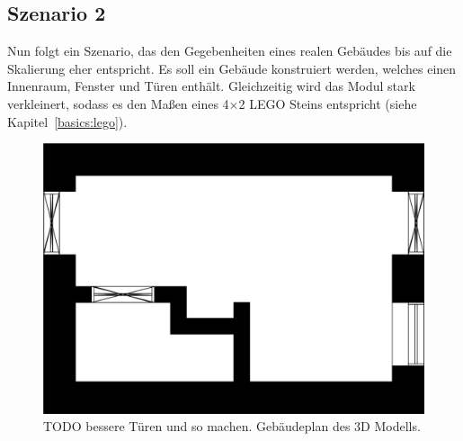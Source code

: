 \subsection{Szenario 2}\label{scenarios:scenario2}
Nun folgt ein Szenario, das den Gegebenheiten eines realen Gebäudes bis auf die Skalierung eher entspricht.
Es soll ein Gebäude konstruiert werden, welches einen Innenraum, Fenster und Türen enthält.
Gleichzeitig wird das Modul stark verkleinert, sodass es den Maßen eines 4$\times$2 LEGO Steins entspricht (siehe Kapitel~\ref{basics:lego}).

\begin{figure}[ht]
  \centering
  \includegraphics[width=0.505\columnwidth]{fig/scenario1_story_plan.jpg}
  \caption{TODO bessere Türen und so machen. Gebäudeplan des 3D Modells.}\label{fig:scenarios:Scenario2 Gebaeudeplan}
\end{figure}

